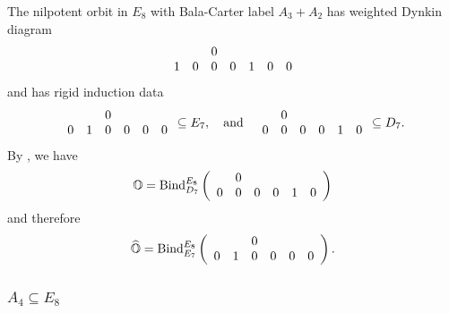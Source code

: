 \documentclass[11pt]{amsart}
\renewcommand{\O}{{\mathbb O}}
\newcommand{\BInd}{{{\mbox{\rm Bind}}}}
\newcommand{\hatO}{\widehat{\O}}
\numberwithin{equation}{section}
\begin{document}
	The nilpotent orbit in $E_8$ with Bala-Carter label $A_3+A_2$ has weighted Dynkin diagram
	$$\begin{array}{c c c c c c c}
		& & 0 & & & & \\
		1 & 0 & 0 & 0 & 1 & 0 & 0\\
	\end{array}$$ and has rigid induction data $$\begin{array}{c c c c c c}
		& & 0 & & & \\
		0 & 1 & 0 & 0 & 0 & 0  \\
	\end{array}\subseteq E_7,\quad\mbox{and}\quad \begin{array}{c c c c c c}
		& 0 & &  & &\\
		0 & 0 & 0 & 0 & 1 & 0\\
	\end{array}\subseteq D_7.$$
	By \cite[Proposition 3.1]{Fu}, we have $$\O= \BInd_{D_7}^{E_8}\left(\begin{array}{c c c c c c}
		& 0 & &  & &\\
		0 & 0 & 0 & 0 & 1 & 0\\
	\end{array}\right)$$ and therefore 
	$$\hatO= \BInd_{E_7}^{E_8}\left(\begin{array}{c c c c c c}
		& & 0 & & &\\
		0 & 1 & 0 & 0 & 0 & 0\\
	\end{array}\right).$$
	
	
	\subsubsection{\texorpdfstring{$A_4\subseteq E_8$}{A4 in E8}}\label{sss: A4 in E8}
	
\end{document}
